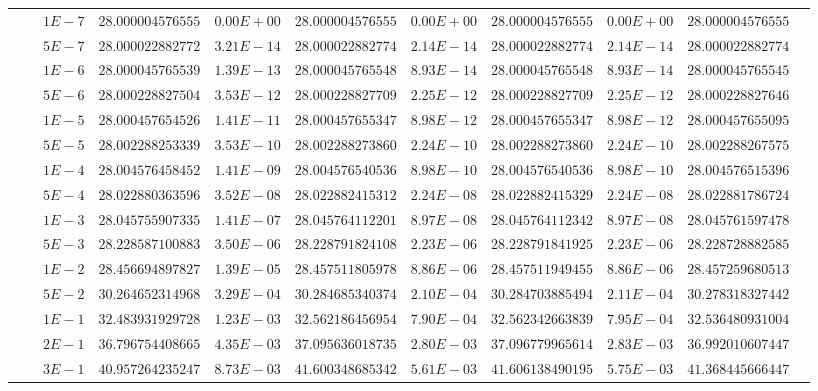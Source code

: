 \begin{landscape}
\begin{table}[ht]
{\begin{tabular}[c]{c|c|c|c|c|c|c|c|c|c|c}
& &$1E-7$ & $28.000004576555$ & $0.00E+00$ & $28.000004576555$ & $0.00E+00$ & $28.000004576555$ & $0.00E+00$ & $28.000004576555$ & \\
& &$5E-7$ & $28.000022882772$ & $3.21E-14$ & $28.000022882774$ & $2.14E-14$ & $28.000022882774$ & $2.14E-14$ & $28.000022882774$ & \\
& &$1E-6$ & $28.000045765539$ & $1.39E-13$ & $28.000045765548$ & $8.93E-14$ & $28.000045765548$ & $8.93E-14$ & $28.000045765545$ & \\
& &$5E-6$ & $28.000228827504$ & $3.53E-12$ & $28.000228827709$ & $2.25E-12$ & $28.000228827709$ & $2.25E-12$ & $28.000228827646$ & \\
& &$1E-5$ & $28.000457654526$ & $1.41E-11$ & $28.000457655347$ & $8.98E-12$ & $28.000457655347$ & $8.98E-12$ & $28.000457655095$ & \\
& &$5E-5$ & $28.002288253339$ & $3.53E-10$ & $28.002288273860$ & $2.24E-10$ & $28.002288273860$ & $2.24E-10$ & $28.002288267575$ & \\
& &$1E-4$ & $28.004576458452$ & $1.41E-09$ & $28.004576540536$ & $8.98E-10$ & $28.004576540536$ & $8.98E-10$ & $28.004576515396$ & \\
& &$5E-4$ & $28.022880363596$ & $3.52E-08$ & $28.022882415312$ & $2.24E-08$ & $28.022882415329$ & $2.24E-08$ & $28.022881786724$ & \\
& &$1E-3$ & $28.045755907335$ & $1.41E-07$ & $28.045764112201$ & $8.97E-08$ & $28.045764112342$ & $8.97E-08$ & $28.045761597478$ & \\
& &$5E-3$ & $28.228587100883$ & $3.50E-06$ & $28.228791824108$ & $2.23E-06$ & $28.228791841925$ & $2.23E-06$ & $28.228728882585$ & \\
& &$1E-2$ & $28.456694897827$ & $1.39E-05$ & $28.457511805978$ & $8.86E-06$ & $28.457511949455$ & $8.86E-06$ & $28.457259680513$ & \\
& &$5E-2$ & $30.264652314968$ & $3.29E-04$ & $30.284685340374$ & $2.10E-04$ & $30.284703885494$ & $2.11E-04$ & $30.278318327442$ & \\
& &$1E-1$ & $32.483931929728$ & $1.23E-03$ & $32.562186456954$ & $7.90E-04$ & $32.562342663839$ & $7.95E-04$ & $32.536480931004$ & \\
& &$2E-1$ & $36.796754408665$ & $4.35E-03$ & $37.095636018735$ & $2.80E-03$ & $37.096779965614$ & $2.83E-03$ & $36.992010607447$ & \\
& &$3E-1$ & $40.957264235247$ & $8.73E-03$ & $41.600348685342$ & $5.61E-03$ & $41.606138490195$ & $5.75E-03$ & $41.368445666447$ & \\

\end{tabular}}
\end{table}
\end{landscape}
